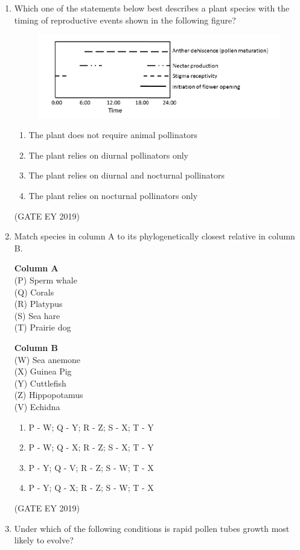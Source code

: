 \documentclass[journal,12pt,onecolumn]{IEEEtran}
\theoremstyle{remark}
\begin{document}
\begin{enumerate}[resume]
\item Which one of the statements below best describes a plant species with the timing of reproductive events shown in the following figure?
\begin{figure}[H]
    \centering
    \includegraphics[]{figs/44.png}
    \caption{}
    \label{fig:11}
\end{figure}

\begin{enumerate}
\item The plant does not require animal pollinators
\item The plant relies on diurnal pollinators only
\item The plant relies on diurnal and nocturnal pollinators
\item The plant relies on nocturnal pollinators only
\end{enumerate}


\hfill{(GATE EY 2019)}

\item Match species in column A to its phylogenetically closest relative in column B.

\begin{multicols}{2}
\textbf{Column A}\\
(P) Sperm whale\\
(Q) Corals\\
(R) Platypus\\
(S) Sea hare\\
(T) Prairie dog\\

\columnbreak

\textbf{Column B}\\
(W) Sea anemone\\
(X) Guinea Pig\\
(Y) Cuttlefish\\
(Z) Hippopotamus\\
(V) Echidna\\
\end{multicols}

\begin{multicols}{2}
\begin{enumerate}
\item P - W; Q - Y; R - Z; S - X; T - Y
\item P - W; Q - X; R - Z; S - X; T - Y
\item P - Y; Q - V; R - Z; S - W; T - X
\item P - Y; Q - X; R - Z; S - W; T - X
\end{enumerate}
\end{multicols}
\hfill{(GATE EY 2019)}
\item Under which of the following conditions is rapid pollen tubes growth most likely to evolve?



\end{enumerate}
\end{document}
